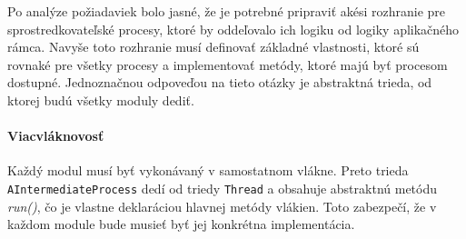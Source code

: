 Po analýze požiadaviek bolo jasné, že je potrebné pripraviť akési rozhranie pre sprostredkovateľské 
procesy, ktoré by oddeľovalo ich logiku od logiky aplikačného rámca. Navyše toto rozhranie musí 
definovať základné vlastnosti, ktoré sú rovnaké pre všetky procesy a implementovať metódy, ktoré 
majú byť procesom dostupné. Jednoznačnou odpoveďou na tieto otázky je abstraktná trieda, 
od ktorej budú všetky moduly dediť. 


\paragraph{Viacvláknovosť}
Každý modul musí byť vykonávaný v samostatnom vlákne. Preto trieda \verb|AIntermediateProcess| dedí
od triedy \verb|Thread| a obsahuje abstraktnú metódu \emph{run()}, čo je vlastne deklaráciou 
hlavnej metódy vlákien. Toto zabezpečí, že v každom module bude musieť byť jej konkrétna implementácia.


